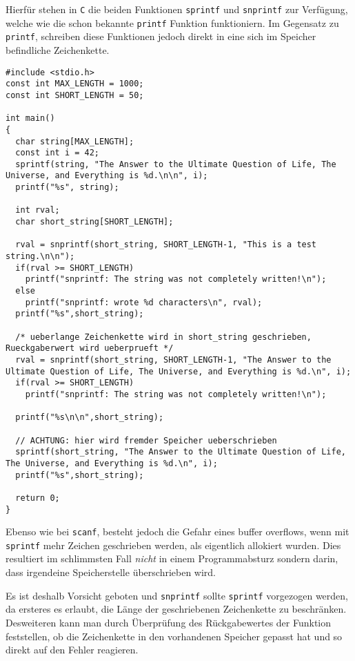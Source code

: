 Hierfür stehen in \texttt{C} die beiden Funktionen \texttt{sprintf} und \texttt{snprintf} zur Verfügung, welche wie die schon bekannte \texttt{printf} Funktion funktioniern.
Im Gegensatz zu \texttt{printf}, schreiben diese Funktionen jedoch direkt in eine sich im Speicher befindliche Zeichenkette.
\begin{lstlisting}
#include <stdio.h>
const int MAX_LENGTH = 1000;
const int SHORT_LENGTH = 50;

int main()
{
  char string[MAX_LENGTH];
  const int i = 42;
  sprintf(string, "The Answer to the Ultimate Question of Life, The Universe, and Everything is %d.\n\n", i);
  printf("%s", string);
  
  int rval;
  char short_string[SHORT_LENGTH];
  
  rval = snprintf(short_string, SHORT_LENGTH-1, "This is a test string.\n\n");
  if(rval >= SHORT_LENGTH) 
    printf("snprintf: The string was not completely written!\n");
  else 
    printf("snprintf: wrote %d characters\n", rval);
  printf("%s",short_string);
  
  /* ueberlange Zeichenkette wird in short_string geschrieben, Rueckgaberwert wird ueberprueft */
  rval = snprintf(short_string, SHORT_LENGTH-1, "The Answer to the Ultimate Question of Life, The Universe, and Everything is %d.\n", i);
  if(rval >= SHORT_LENGTH) 
    printf("snprintf: The string was not completely written!\n");
  
  printf("%s\n\n",short_string);
  
  // ACHTUNG: hier wird fremder Speicher ueberschrieben 
  sprintf(short_string, "The Answer to the Ultimate Question of Life, The Universe, and Everything is %d.\n", i);
  printf("%s",short_string); 
  
  return 0;
}
\end{lstlisting}
Ebenso wie bei \texttt{scanf}, besteht jedoch die Gefahr eines buffer overflows, wenn mit \texttt{sprintf} mehr Zeichen geschrieben werden, als eigentlich allokiert wurden.
Dies resultiert im schlimmsten Fall \emph{nicht} in einem Programmabsturz sondern darin, dass irgendeine Speicherstelle überschrieben wird.

Es ist deshalb Vorsicht geboten und \texttt{snprintf} sollte \texttt{sprintf} vorgezogen werden, da ersteres es erlaubt, die Länge der geschriebenen Zeichenkette zu beschränken.
Desweiteren kann man durch Überprüfung des Rückgabewertes der Funktion feststellen, ob die Zeichenkette in den vorhandenen Speicher gepasst hat und so direkt auf den Fehler reagieren.

